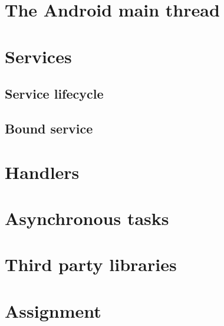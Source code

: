 \section{The Android main thread}
\section{Services}
\subsection{Service lifecycle}
\subsection{Bound service}
\section{Handlers}
\section{Asynchronous tasks}
\section{Third party libraries}
\section{Assignment}